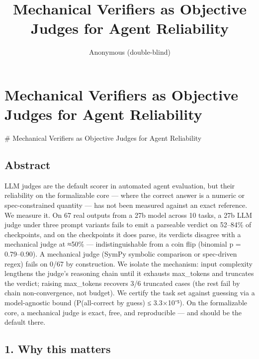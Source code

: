 \documentclass[10pt]{article}
\title{\textbf{Mechanical Verifiers as Objective Judges for Agent Reliability}}
\author{Anonymous (double-blind)}
\date{}
\begin{document}
\maketitle
\section*{Mechanical Verifiers as Objective Judges for Agent Reliability}\vspace{-6pt}

\# Mechanical Verifiers as Objective Judges for Agent Reliability

\subsection*{Abstract}

LLM judges are the default scorer in automated agent evaluation, but their reliability on the formalizable core — where the correct answer is a numeric or spec-constrained quantity — has not been measured against an exact reference. We measure it. On 67 real outputs from a 27b model across 10 tasks, a 27b LLM judge under three prompt variants fails to emit a parseable verdict on 52–84\% of checkpoints, and on the checkpoints it does parse, its verdicts disagree with a mechanical judge at ≈50\% — indistinguishable from a coin flip (binomial p = 0.79–0.90). A mechanical judge (SymPy symbolic comparison or spec-driven regex) fails on 0/67 by construction. We isolate the mechanism: input complexity lengthens the judge's reasoning chain until it exhausts max\_tokens and truncates the verdict; raising max\_tokens recovers 3/6 truncated cases (the rest fail by chain non-convergence, not budget). We certify the task set against guessing via a model-agnostic bound (P(all-correct by guess) ≤ 3.3×10⁻⁵). On the formalizable core, a mechanical judge is exact, free, and reproducible — and should be the default there.

\subsection*{1. Why this matters}
\end{document}
